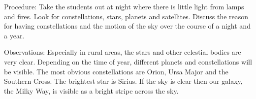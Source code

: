 \begin{multicols}{2}
\begin{description*}
\item[Procedure:]{Take the students out at night where there is little light from lamps and fires. Look for constellations, stars, planets and satellites. Discuss the reason for having constellations and the motion of the sky over the course of a night and a year.}
\item[Observations:]{Especially in rural areas, the stars and other celestial bodies are very clear. Depending on the time of year, different planets and constellations will be visible. The most obvious constellations are Orion, Ursa Major and the Southern Cross. The brightest star is Sirius. If the sky is clear then our galaxy, the Milky Way, is visible as a bright stripe across the sky.}
\end{description*}









\end{multicols}

\pagebreak